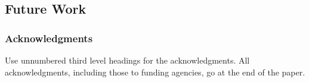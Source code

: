 \documentclass{article} %
\begin{document}
\subsection{Future Work}
\subsubsection*{Acknowledgments}
Use unnumbered third level headings for the acknowledgments. All
acknowledgments, including those to funding agencies, go at the end of the paper.




\end{document}
